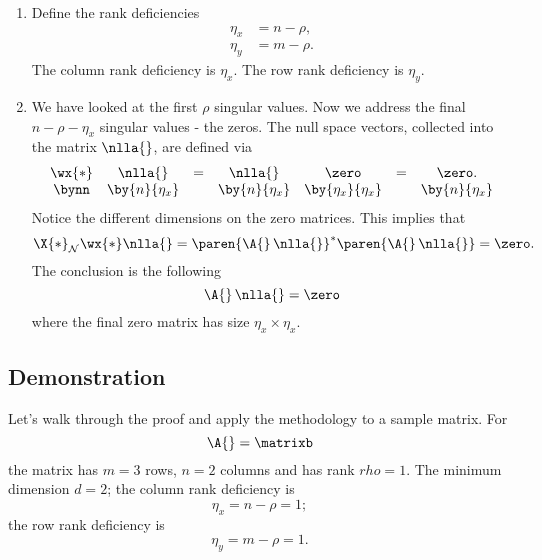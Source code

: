 \begin{enumerate}
\item Define the rank deficiencies
\begin{equation}
  \begin{split}
     \eta_{x} &= n - \rho,\\
     \eta_{y} &= m - \rho.
  \end{split}
\end{equation}
\subitem The column rank deficiency is $\eta_{x}$.
\subitem The row rank deficiency is $\eta_{y}$.
\item {} We have looked at the first $\rho$ singular values. Now we address the final $n-\rho-\eta_{x}$ singular values - the zeros. The null space vectors, collected into the matrix $\nlla{}$, are defined via
\begin{equation}
\begin{array}{ccccccc}
  \wx{*} & \nlla{} &=& \nlla{}&\zero &=& \zero.\\
  \bynn  & \by{n}{\eta_{x}}    && \by{n}{\eta_{x}} & \by{\eta_{x}}{\eta_{x}} && \by{n}{\eta_{x}}
\end{array}
\end{equation}
\subitem Notice the different dimensions on the zero matrices.
This implies that
\begin{equation}
  \X{*}_{\mathcal{N}}\wx{*}\nlla{} = \paren{\A{}\,\nlla{}}^{*}\paren{\A{}\,\nlla{}} = \zero.
\end{equation}
The conclusion is the following
\begin{equation}
  \A{}\,\nlla{} = \zero
\end{equation}
where the final zero matrix has size $\eta_{x}\times \eta_{x}$.
\end{enumerate}

\subsection{Demonstration}
Let's walk through the proof and apply the methodology to a sample matrix. For 
\begin{equation}
  \A{} = \matrixb
\end{equation}
the matrix has $m=3$ rows, $n=2$ columns and has rank $rho=1$. The minimum dimension $d=2$; the column rank deficiency is
\begin{equation}
  \eta_{x} = n - \rho = 1;
\end{equation}
the row rank deficiency is
\begin{equation}
  \eta_{y} = m - \rho = 1.
\end{equation}

